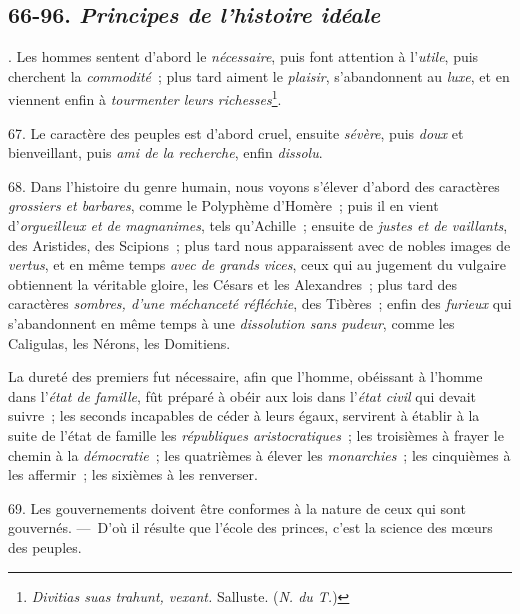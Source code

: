 \documentclass[french,twoside]{book} %
\begin{document}
\subsection[{66-96. Principes de l’histoire idéale}]{ \textsc{66-96. } {\itshape Principes de l’histoire idéale} }
. Les hommes sentent d’abord le {\itshape nécessaire}, puis font attention à l’{\itshape utile}, puis cherchent la {\itshape commodité} ; plus tard aiment le {\itshape plaisir}, s’abandonnent  au {\itshape luxe}, et en viennent enfin à {\itshape tourmenter leurs richesses}\footnote{{\itshape Divitias suas trahunt, vexant.} Salluste. ({\itshape N. du T.})}.\par
\par
67. Le caractère des peuples est d’abord cruel, ensuite {\itshape sévère}, puis {\itshape doux} et bienveillant, puis {\itshape ami de la recherche}, enfin {\itshape dissolu}.\par
68. Dans l’histoire du genre humain, nous voyons s’élever d’abord des caractères {\itshape grossiers et barbares}, comme le Polyphème d’Homère ; puis il en vient d’{\itshape orgueilleux et de magnanimes}, tels qu’Achille ; ensuite de {\itshape justes et de vaillants}, des Aristides, des Scipions ; plus tard nous apparaissent avec de nobles images de {\itshape vertus}, et en même temps {\itshape avec de grands vices}, ceux qui au jugement du vulgaire obtiennent la véritable gloire, les Césars et les Alexandres ; plus tard des caractères {\itshape sombres, d’une méchanceté réfléchie}, des Tibères ; enfin des {\itshape furieux} qui s’abandonnent en même temps à une {\itshape dissolution sans pudeur}, comme les Caligulas, les Nérons, les Domitiens.\par
La dureté des premiers fut nécessaire, afin que l’homme, obéissant à l’homme dans l’{\itshape état de famille}, fût préparé à obéir aux lois dans l’{\itshape état civil} qui devait suivre ; les seconds incapables de céder à leurs égaux, servirent à établir à la suite de l’état de famille les {\itshape républiques aristocratiques} ; les troisièmes à frayer le chemin à la {\itshape démocratie} ; les quatrièmes  à élever les {\itshape monarchies} ; les cinquièmes à les affermir ; les sixièmes à les renverser.\par
69. Les gouvernements doivent être conformes à la nature de ceux qui sont gouvernés. — D’où il résulte que l’école des princes, c’est la science des mœurs des peuples.\par
\end{document}
